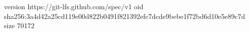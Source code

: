version https://git-lfs.github.com/spec/v1
oid sha256:3a4d42a25cd119e00d822b0491f821392efc7dcde9bebe1f72bd6d10e5e89c7d
size 70172
